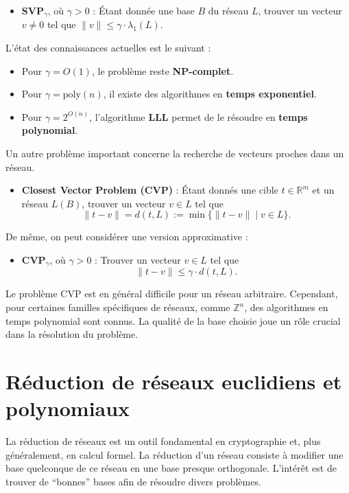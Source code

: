 \documentclass[a4paper,12pt]{report}  %
\theoremstyle{definitionstyle}
\theoremstyle{examplestyle}
\theoremstyle{remarkstyle}
\theoremstyle{propositionstyle}
\theoremstyle{theoremstyle}
\theoremstyle{proofstyle}
\begin{document}
	\begin{itemize}
		\item \textbf{SVP$_\gamma$}, où $\gamma > 0$ : Étant donnée une base $B$ du réseau $L$, trouver un vecteur $v \neq 0$ tel que $\|v\| \leq \gamma \cdot \lambda_1(L)$.
	\end{itemize}
	
	L’état des connaissances actuelles est le suivant :
	
	\begin{itemize}
		\item Pour $\gamma = O(1)$, le problème reste \textbf{NP-complet}.
		\item Pour $\gamma = \text{poly}(n)$, il existe des algorithmes en \textbf{temps exponentiel}.
		\item Pour $\gamma = 2^{O(n)}$, l’algorithme \textbf{LLL} permet de le résoudre en \textbf{temps polynomial}.
	\end{itemize}
	
	Un autre problème important concerne la recherche de vecteurs proches dans un réseau.
	
	\begin{itemize}
		\item \textbf{Closest Vector Problem (CVP)} : Étant donnés une cible $t \in \mathbb{R}^m$ et un réseau $L(B)$, trouver un vecteur $v \in L$ tel que 
		\[
		\|t - v\| = d(t, L) := \min \{ \|t - v\| \mid v \in L \}.
		\]
	\end{itemize}
	
	De même, on peut considérer une version approximative :
	
	\begin{itemize}
		\item \textbf{CVP$_\gamma$}, où $\gamma > 0$ : Trouver un vecteur $v \in L$ tel que 
		\[
		\|t - v\| \leq \gamma \cdot d(t, L).
		\]
	\end{itemize}
	
	Le problème CVP est en général difficile pour un réseau arbitraire. Cependant, pour certaines familles spécifiques de réseaux, comme $\mathbb{Z}^n$, des algorithmes en temps polynomial sont connus. La qualité de la base choisie joue un rôle crucial dans la résolution du problème.
		
	\section{Réduction de réseaux euclidiens et polynomiaux}
	
	
	La réduction de réseaux est un outil fondamental en cryptographie et, plus généralement, en calcul formel. La réduction d'un réseau consiste à modifier une base quelconque de ce réseau en une base presque orthogonale. L'intérêt est de trouver de ``bonnes'' bases afin de résoudre divers problèmes.
	
\end{document}
